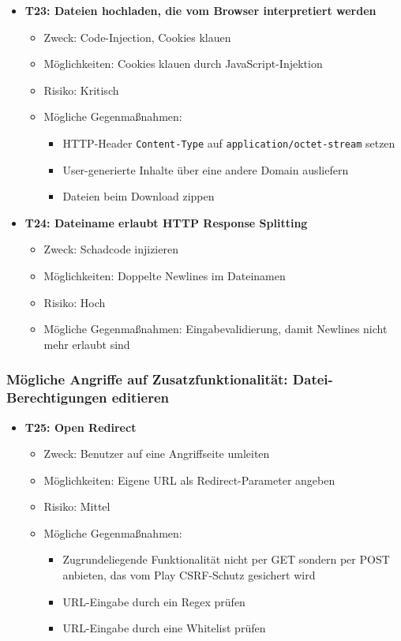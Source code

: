 \documentclass[12pt,DIV14,BCOR10mm,a4paper,parskip=half-,headsepline,headinclude,english,ngerman,bibliography=totocnumbered]{scrreprt}
\begin{document}
\begin{itemize}
  \hypertarget{threat23}{}
  \item \textbf{T23: Dateien hochladen, die vom Browser interpretiert werden}
  \begin{itemize}
  \item Zweck: Code-Injection, Cookies klauen
  \item Möglichkeiten: Cookies klauen durch JavaScript-Injektion
  \item Risiko: Kritisch
  \item Mögliche Gegenmaßnahmen:
    \begin{itemize}
      \item HTTP-Header \texttt{Content-Type} auf \texttt{application/octet-stream} setzen
      \item User-generierte Inhalte über eine andere Domain ausliefern
      \item Dateien beim Download zippen
    \end{itemize}
  \end{itemize}

  \hypertarget{threat24}{}
  \item \textbf{T24: Dateiname erlaubt HTTP Response Splitting}
  \begin{itemize}
  \item Zweck: Schadcode injizieren
  \item Möglichkeiten: Doppelte Newlines im Dateinamen
  \item Risiko: Hoch
  \item Mögliche Gegenmaßnahmen: Eingabevalidierung, damit Newlines nicht mehr erlaubt sind
  \end{itemize}
\end{itemize}

\subsubsection{Mögliche Angriffe auf Zusatzfunktionalität: Datei-Berechtigungen editieren}

\begin{itemize}

  \hypertarget{threat25}{}
  \item \textbf{T25: Open Redirect}
  \begin{itemize}
    \item Zweck: Benutzer auf eine Angriffseite umleiten
    \item Möglichkeiten: Eigene URL als Redirect-Parameter angeben
    \item Risiko: Mittel
    \item Mögliche Gegenmaßnahmen:
      \begin{itemize}
      	\item Zugrundeliegende Funktionalität nicht per GET sondern per POST anbieten, das vom Play CSRF-Schutz gesichert wird
      	\item URL-Eingabe durch ein Regex prüfen
      	\item URL-Eingabe durch eine Whitelist prüfen
      \end{itemize}
  \end{itemize}
\end{itemize}
\end{document}
